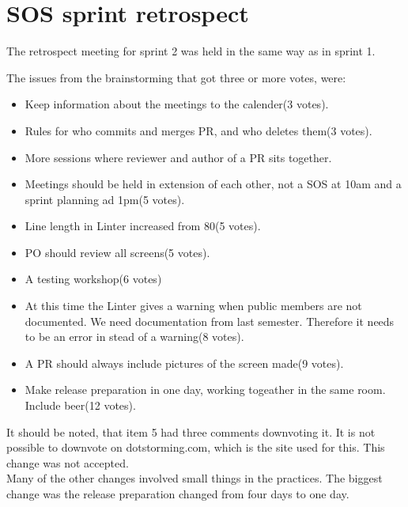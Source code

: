 \section{SOS sprint retrospect}

The retrospect meeting for sprint 2 was held in the same way as in sprint 1.

The issues from the brainstorming that got three or more votes, were:
\begin{itemize}
    \item Keep information about the meetings to the calender(3 votes).
    \item Rules for who commits and merges \gls{PR}, and who deletes them(3 votes).
    \item More sessions where reviewer and author of a \gls{PR} sits together. 
    \item Meetings should be held in extension of each other, not a SOS at 10am and a sprint planning ad 1pm(5 votes).  
    \item Line length in Linter increased from 80(5 votes).    
    \item PO should review all screens(5 votes).
    \item A testing workshop(6 votes)
    \item At this time the Linter gives a warning when public members are not documented. We need documentation from last semester. Therefore it needs to be an error in stead of a warning(8 votes).
    \item A \gls{PR} should always include pictures of the screen made(9 votes).
    \item Make release preparation in one day, working togeather in the same room. Include beer(12 votes).
\end{itemize}

It should be noted, that item 5 had three comments downvoting it. It is not possible to downvote on dotstorming.com, which is the site used for this. This change was not accepted.\\
Many of the other changes involved small things in the practices. The biggest change was the release preparation changed from four days to one day.\\
